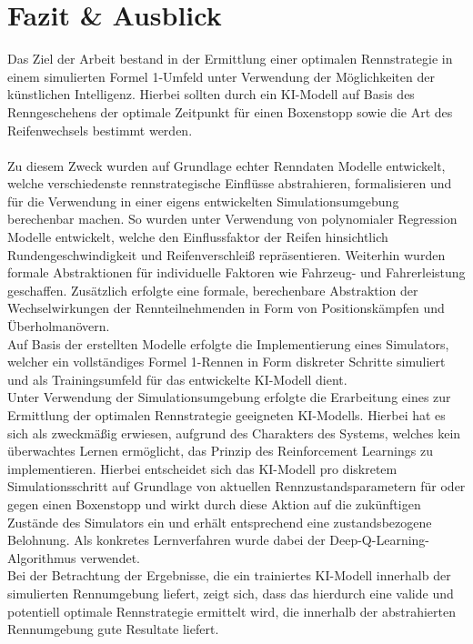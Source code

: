 \section{Fazit \& Ausblick}
Das Ziel der Arbeit bestand in der Ermittlung einer optimalen Rennstrategie in einem simulierten Formel 1-Umfeld unter Verwendung der Möglichkeiten der künstlichen Intelligenz. Hierbei sollten durch ein KI-Modell auf Basis des Renngeschehens der optimale Zeitpunkt für einen Boxenstopp sowie die Art des Reifenwechsels bestimmt werden.\\\\
Zu diesem Zweck wurden auf Grundlage echter Renndaten Modelle entwickelt, welche verschiedenste rennstrategische Einflüsse abstrahieren, formalisieren und für die Verwendung in einer eigens entwickelten Simulationsumgebung berechenbar machen. So wurden unter Verwendung von polynomialer Regression Modelle entwickelt, welche den Einflussfaktor der Reifen hinsichtlich Rundengeschwindigkeit und Reifenverschleiß repräsentieren. Weiterhin wurden formale Abstraktionen für individuelle Faktoren wie Fahrzeug- und Fahrerleistung geschaffen. Zusätzlich erfolgte eine formale, berechenbare Abstraktion der Wechselwirkungen der Rennteilnehmenden in Form von Positionskämpfen und Überholmanövern.\\
Auf Basis der erstellten Modelle erfolgte die Implementierung eines Simulators, welcher ein vollständiges Formel 1-Rennen in Form diskreter Schritte simuliert und als Trainingsumfeld für das entwickelte KI-Modell dient.\\
Unter Verwendung der Simulationsumgebung erfolgte die Erarbeitung eines zur Ermittlung der optimalen Rennstrategie geeigneten KI-Modells. Hierbei hat es sich als zweckmäßig erwiesen, aufgrund des Charakters des Systems, welches kein überwachtes Lernen ermöglicht, das Prinzip des Reinforcement Learnings zu implementieren. Hierbei entscheidet sich das KI-Modell pro diskretem Simulationsschritt auf Grundlage von aktuellen Rennzustandsparametern für oder gegen einen Boxenstopp und wirkt durch diese Aktion auf die zukünftigen Zustände des Simulators ein und erhält entsprechend eine zustandsbezogene Belohnung. Als konkretes Lernverfahren wurde dabei der Deep-Q-Learning-Algorithmus verwendet.\\
Bei der Betrachtung der Ergebnisse, die ein trainiertes KI-Modell innerhalb der simulierten Rennumgebung liefert, zeigt sich, dass das hierdurch eine valide und potentiell optimale Rennstrategie ermittelt wird, die innerhalb der abstrahierten Rennumgebung gute Resultate liefert.
